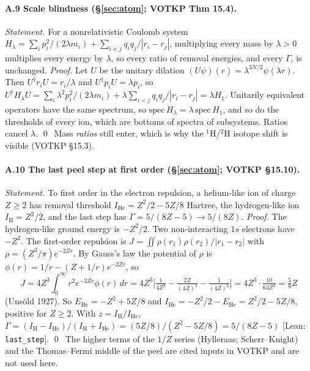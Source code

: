 \paragraph{A.9 Scale blindness (§\ref{sec:atom}; VOTKP Thm 15.4).}
\emph{Statement.} For a nonrelativistic Coulomb system $H_\lambda=\sum_i p_i^2/(2\lambda m_i)+\sum_{i<j}q_iq_j/|r_i-r_j|$, multiplying every mass by $\lambda>0$ multiplies every energy by $\lambda$, so every ratio of removal energies, and every $\Gamma$, is unchanged.
\emph{Proof.} Let $U$ be the unitary dilation $(U\psi)(r)=\lambda^{3N/2}\psi(\lambda r)$. Then $U^\dagger r_iU=r_i/\lambda$ and $U^\dagger p_iU=\lambda p_i$, so $U^\dagger H_\lambda U=\sum_i\lambda^2p_i^2/(2\lambda m_i)+\lambda\sum_{i<j}q_iq_j/|r_i-r_j|=\lambda H_1$. Unitarily equivalent operators have the same spectrum, so $\mathrm{spec}\,H_\lambda=\lambda\,\mathrm{spec}\,H_1$, and so do the thresholds of every ion, which are bottoms of spectra of subsystems. Ratios cancel $\lambda$. \qed\ Mass \emph{ratios} still enter, which is why the ${}^1$H/${}^2$H isotope shift is visible (VOTKP §15.3).

\paragraph{A.10 The last peel step at first order (§\ref{sec:atom}; VOTKP §15.10).}
\emph{Statement.} To first order in the electron repulsion, a helium-like ion of charge $Z\ge2$ has removal threshold $I_{\mathrm{He}}=Z^2/2-5Z/8$ Hartree, the hydrogen-like ion $I_{\mathrm H}=Z^2/2$, and the last step has $\Gamma=5/(8Z-5)\to5/(8Z)$.
\emph{Proof.} The hydrogen-like ground energy is $-Z^2/2$. Two non-interacting $1s$ electrons have $-Z^2$. The first-order repulsion is $J=\iint\rho(r_1)\rho(r_2)/|r_1-r_2|$ with $\rho=(Z^3/\pi)e^{-2Zr}$. By Gauss's law the potential of $\rho$ is $\phi(r)=1/r-(Z+1/r)e^{-2Zr}$, so
\[
J=4Z^3\!\int_0^\infty\! r^2e^{-2Zr}\phi(r)\,dr=4Z^3\Big[\tfrac1{4Z^2}-\tfrac{2Z}{(4Z)^3}-\tfrac1{(4Z)^2}\Big]=4Z^3\cdot\tfrac{10}{64Z^2}=\tfrac58Z
\]
(Unsöld 1927). So $E_{\mathrm{He}}=-Z^2+5Z/8$ and $I_{\mathrm{He}}=-Z^2/2-E_{\mathrm{He}}=Z^2/2-5Z/8$, positive for $Z\ge2$. With $z=I_{\mathrm H}/I_{\mathrm{He}}$, $\Gamma=(I_{\mathrm H}-I_{\mathrm{He}})/(I_{\mathrm H}+I_{\mathrm{He}})=(5Z/8)/(Z^2-5Z/8)=5/(8Z-5)$ \textsf{[Lean: \texttt{last\_step}]}. \qed\ The higher terms of the $1/Z$ series (Hylleraas; Scherr–Knight) and the Thomas–Fermi middle of the peel are cited inputs in VOTKP and are not used here.

